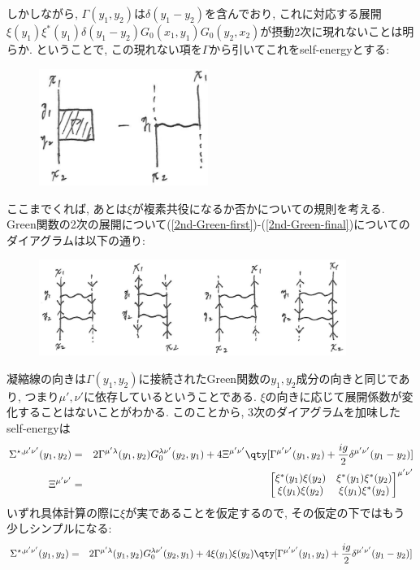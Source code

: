 \documentclass[10.5pt,a4paper]{jreport}
\begin{document}
しかしながら, $\Gamma(y_1, y_2)$は$\delta(y_1 - y_2)$を含んでおり, これに対応する展開$\xi(y_1)\xi^*(y_1)\delta(y_1 - y_2)G_0(x_1, y_1)G_0(y_2, x_2)$が摂動2次に現れないことは明らか. ということで, この現れない項を$\Gamma$から引いてこれをself-energyとする:
\begin{figure}[H]
  \begin{center}
    \includegraphics[width = 5.5cm]{./EPS/ladder3-4.eps}
  \end{center}
\end{figure}
ここまでくれば, あとは$\xi$が複素共役になるか否かについての規則を考える. Green関数の2次の展開について(\ref{2nd-Green-first})-(\ref{2nd-Green-final})についてのダイアグラムは以下の通り:
\begin{figure}[H]
  \begin{center}
    \includegraphics[width = 10cm]{./EPS/ladder3-3.eps}
  \end{center}
\end{figure}
凝縮線の向きは$\Gamma(y_1, y_2)$に接続されたGreen関数の$y_1, y_2$成分の向きと同じであり, つまり$\mu', \nu'$に依存しているということである. $\xi$の向きに応じて展開係数が変化することはないことがわかる. このことから, 3次のダイアグラムを加味したself-energyは
\begin{eqnarray}
  \Sigma^{\star, \mu'\nu'}(y_1, y_2) &=& 2\Gamma^{\mu'\lambda}(y_1, y_2)G_0^{\lambda\nu'}(y_2, y_1) + 4\Xi^{\mu'\nu'}\qty[\Gamma^{\mu'\nu'}(y_1, y_2) + \frac{ig}{2}\delta^{\mu'\nu'}(y_1 - y_2)]\\
  \Xi^{\mu'\nu'}&=&
  \begin{bmatrix}
    \xi^*(y_1)\xi(y_2)&\xi^*(y_1)\xi^*(y_2)\\
    \xi(y_1)\xi(y_2)&\xi(y_1)\xi^*(y_2)
  \end{bmatrix}^{\mu'\nu'}
\end{eqnarray}
いずれ具体計算の際に$\xi$が実であることを仮定するので, その仮定の下ではもう少しシンプルになる:
\begin{eqnarray}
  \Sigma^{\star, \mu'\nu'}(y_1, y_2) &=& 2\Gamma^{\mu'\lambda}(y_1, y_2)G_0^{\lambda\nu'}(y_2, y_1) + 4\xi(y_1)\xi(y_2)\qty[\Gamma^{\mu'\nu'}(y_1, y_2) + \frac{ig}{2}\delta^{\mu'\nu'}(y_1 - y_2)]
\end{eqnarray}
\end{document}
